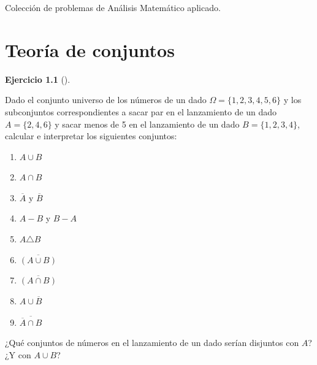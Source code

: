 \documentclass[
  a4paper,
]{scrreport}
\providecommand{\tightlist}{%
  \setlength{\itemsep}{0pt}\setlength{\parskip}{0pt}}\usepackage{longtable,booktabs,array}
\theoremstyle{definition}
\newtheorem{exercise}{Ejercicio}[chapter]
\theoremstyle{remark}
\begin{document}

Colección de problemas de Análisis Matemático aplicado.


\chapter{Teoría de conjuntos}\label{teoruxeda-de-conjuntos}

\begin{exercise}[]\protect\hypertarget{exr-operaciones-conjuntos}{}\label{exr-operaciones-conjuntos}

Dado el conjunto universo de los números de un dado
\(\Omega=\{1, 2, 3, 4, 5, 6\}\) y los subconjuntos correspondientes a
sacar par en el lanzamiento de un dado \(A=\{2, 4, 6\}\) y sacar menos
de 5 en el lanzamiento de un dado \(B=\{1, 2, 3, 4\}\), calcular e
interpretar los siguientes conjuntos:

\begin{enumerate}
\def\labelenumi{\alph{enumi}.}
\tightlist
\item
  \(A\cup B\)
\item
  \(A\cap B\)
\item
  \(\overline A\) y \(\overline B\)
\item
  \(A-B\) y \(B-A\)
\item
  \(A\triangle B\)
\item
  \(\overline{(A\cup B)}\)
\item
  \(\overline{(A\cap B)}\)
\item
  \(A\cup \overline B\)
\item
  \(\overline{\overline A \cap B}\)
\end{enumerate}

¿Qué conjuntos de números en el lanzamiento de un dado serían disjuntos
con \(A\)? ¿Y con \(A\cup B\)?

\end{exercise}
\end{document}
